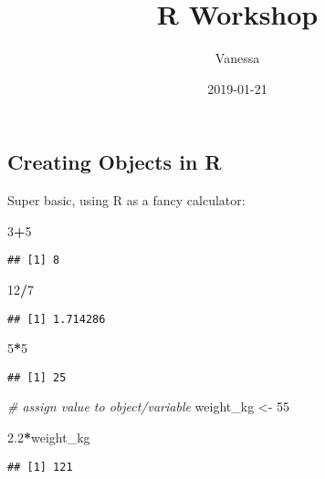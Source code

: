 \documentclass[]{article}
\title{R Workshop}
\author{Vanessa}
\date{2019-01-21}
\newenvironment{Shaded}{\begin{snugshade}}{\end{snugshade}}
\newcommand{\DecValTok}[1]{\textcolor[rgb]{0.00,0.00,0.81}{#1}}
\newcommand{\FloatTok}[1]{\textcolor[rgb]{0.00,0.00,0.81}{#1}}
\newcommand{\StringTok}[1]{\textcolor[rgb]{0.31,0.60,0.02}{#1}}
\newcommand{\CommentTok}[1]{\textcolor[rgb]{0.56,0.35,0.01}{\textit{#1}}}
\newcommand{\OperatorTok}[1]{\textcolor[rgb]{0.81,0.36,0.00}{\textbf{#1}}}
\newcommand{\NormalTok}[1]{#1}
\begin{document}
\maketitle

\subsection{Creating Objects in R}\label{creating-objects-in-r}

Super basic, using R as a fancy calculator:

\begin{Shaded}
\begin{Highlighting}[]
\DecValTok{3}\OperatorTok{+}\DecValTok{5}
\end{Highlighting}
\end{Shaded}

\begin{verbatim}
## [1] 8
\end{verbatim}

\begin{Shaded}
\begin{Highlighting}[]
\DecValTok{12}\OperatorTok{/}\DecValTok{7}
\end{Highlighting}
\end{Shaded}

\begin{verbatim}
## [1] 1.714286
\end{verbatim}

\begin{Shaded}
\begin{Highlighting}[]
\DecValTok{5}\OperatorTok{*}\DecValTok{5}
\end{Highlighting}
\end{Shaded}

\begin{verbatim}
## [1] 25
\end{verbatim}

\begin{Shaded}
\begin{Highlighting}[]
\CommentTok{# assign value to object/variable}
\NormalTok{weight_kg <-}\StringTok{ }\DecValTok{55}

\FloatTok{2.2}\OperatorTok{*}\NormalTok{weight_kg}
\end{Highlighting}
\end{Shaded}

\begin{verbatim}
## [1] 121
\end{verbatim}
\end{document}
